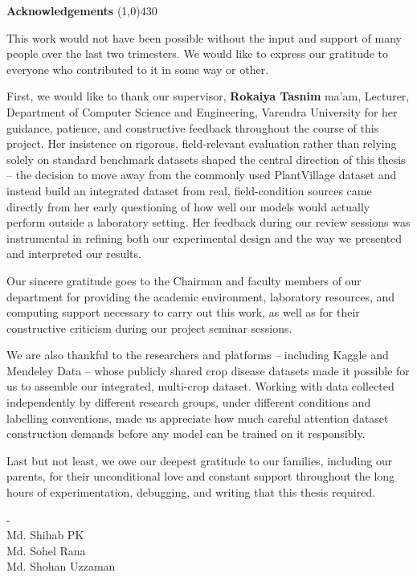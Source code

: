 \begin{center}
{\huge \bf Acknowledgements}
\line(1,0){430}
\end{center}
This work would not have been possible without the input and support of many people over the last two trimesters. We would like to express our gratitude to everyone who contributed to it in some way or other.

First, we would like to thank our supervisor, \textbf{Rokaiya Tasnim} ma'am, Lecturer, Department of Computer Science and Engineering, Varendra University for her guidance, patience, and constructive feedback throughout the course of this project. Her insistence on rigorous, field-relevant evaluation rather than relying solely on standard benchmark datasets shaped the central direction of this thesis -- the decision to move away from the commonly used PlantVillage dataset and instead build an integrated dataset from real, field-condition sources came directly from her early questioning of how well our models would actually perform outside a laboratory setting. Her feedback during our review sessions was instrumental in refining both our experimental design and the way we presented and interpreted our results.

Our sincere gratitude goes to the Chairman and faculty members of our department for providing the academic environment, laboratory resources, and computing support necessary to carry out this work, as well as for their constructive criticism during our project seminar sessions.

We are also thankful to the researchers and platforms -- including Kaggle and Mendeley Data -- whose publicly shared crop disease datasets made it possible for us to assemble our integrated, multi-crop dataset. Working with data collected independently by different research groups, under different conditions and labelling conventions, made us appreciate how much careful attention dataset construction demands before any model can be trained on it responsibly.

Last but not least, we owe our deepest gratitude to our families, including our parents, for their unconditional love and constant support throughout the long hours of experimentation, debugging, and writing that this thesis required.

\vspace{1cm}
 -\\
Md. Shihab PK\\
Md. Sohel Rana\\
Md. Shohan Uzzaman\\